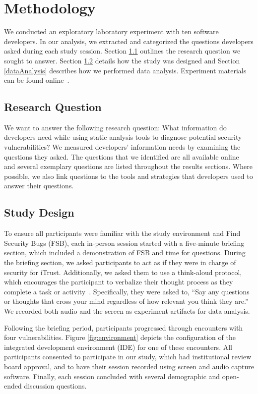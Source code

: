 \documentclass{acm_proc_article-sp}
\begin{document}
\section{Methodology}
\label{sec:meth}
We conducted an exploratory laboratory experiment with ten software developers. In our analysis, we extracted and categorized the questions developers asked during each study session. 
Section \ref{rqs} outlines the research question we sought to answer. 
Section \ref{studyDesign} details how the study was designed and Section \ref{dataAnalysis} describes how we performed data analysis.
Experiment materials can be found online~\cite{ExperimentalMaterials}.

\subsection{Research Question}
\label{rqs}
We want to answer the following research question: What information do developers need while using static analysis tools to diagnose potential security vulnerabilities? 
We measured developers' information needs by examining the questions they asked.
The questions that we identified are all available online~\cite{ExperimentalMaterials} and several exemplary questions are listed throughout the results sections.
Where possible, we also link questions to the tools and strategies that developers used to answer their questions.


\subsection{Study Design}
\label{studyDesign}
To ensure all participants were familiar with the study environment and Find Security Bugs (FSB),
each in-person session started with a five-minute briefing section, which included a demonstration of FSB and time for questions.
During the briefing section, we asked participants to act as if they were in charge of security for iTrust.
Additionally, we asked them to use a think-aloud protocol, which encourages the participant to verbalize their thought process as they complete a task or activity~\cite{nielsen2002getting}. 
Specifically, they were asked to, ``Say any questions or thoughts that cross your mind regardless of how relevant you think they are.''
We recorded both audio and the screen as experiment artifacts for data analysis.

Following the briefing period, participants progressed through encounters with four vulnerabilities. 
Figure \ref{fig:environment} depicts the configuration of the integrated development environment (IDE) for one of these encounters.
All participants consented to participate in our study, which had institutional review board approval, and to have their session recorded using screen and audio capture software.
Finally, each session concluded with several demographic and open-ended discussion questions.
\end{document}
